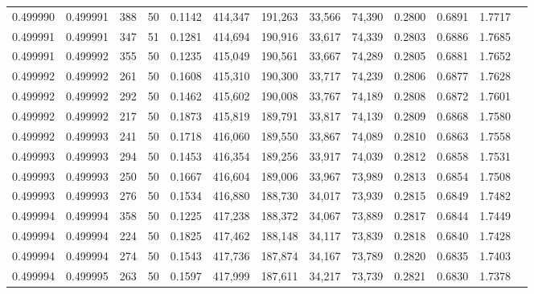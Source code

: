 \begin{tabular}{rrrrrrrrrrrrr}
0.499990 & 0.499991 &   388 &  50 &                                     0.1142 & 414,347 & 191,263 &  33,566 &  74,390 & 0.2800 & 0.6891 & 1.7717 \\
0.499991 & 0.499991 &   347 &  51 &                                     0.1281 & 414,694 & 190,916 &  33,617 &  74,339 & 0.2803 & 0.6886 & 1.7685 \\
0.499991 & 0.499992 &   355 &  50 &                                     0.1235 & 415,049 & 190,561 &  33,667 &  74,289 & 0.2805 & 0.6881 & 1.7652 \\
0.499992 & 0.499992 &   261 &  50 &                                     0.1608 & 415,310 & 190,300 &  33,717 &  74,239 & 0.2806 & 0.6877 & 1.7628 \\
0.499992 & 0.499992 &   292 &  50 &                                     0.1462 & 415,602 & 190,008 &  33,767 &  74,189 & 0.2808 & 0.6872 & 1.7601 \\
0.499992 & 0.499992 &   217 &  50 &                                     0.1873 & 415,819 & 189,791 &  33,817 &  74,139 & 0.2809 & 0.6868 & 1.7580 \\
0.499992 & 0.499993 &   241 &  50 &                                     0.1718 & 416,060 & 189,550 &  33,867 &  74,089 & 0.2810 & 0.6863 & 1.7558 \\
0.499993 & 0.499993 &   294 &  50 &                                     0.1453 & 416,354 & 189,256 &  33,917 &  74,039 & 0.2812 & 0.6858 & 1.7531 \\
0.499993 & 0.499993 &   250 &  50 &                                     0.1667 & 416,604 & 189,006 &  33,967 &  73,989 & 0.2813 & 0.6854 & 1.7508 \\
0.499993 & 0.499993 &   276 &  50 &                                     0.1534 & 416,880 & 188,730 &  34,017 &  73,939 & 0.2815 & 0.6849 & 1.7482 \\
0.499994 & 0.499994 &   358 &  50 &                                     0.1225 & 417,238 & 188,372 &  34,067 &  73,889 & 0.2817 & 0.6844 & 1.7449 \\
0.499994 & 0.499994 &   224 &  50 &                                     0.1825 & 417,462 & 188,148 &  34,117 &  73,839 & 0.2818 & 0.6840 & 1.7428 \\
0.499994 & 0.499994 &   274 &  50 &                                     0.1543 & 417,736 & 187,874 &  34,167 &  73,789 & 0.2820 & 0.6835 & 1.7403 \\
0.499994 & 0.499995 &   263 &  50 &                                     0.1597 & 417,999 & 187,611 &  34,217 &  73,739 & 0.2821 & 0.6830 & 1.7378 \\

\end{tabular}
